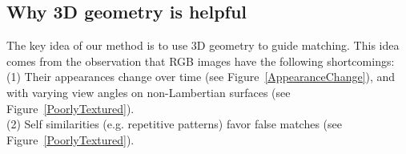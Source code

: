 
\subsection{Why 3D geometry is helpful}
The key idea of our method is to use 3D geometry to guide matching. This idea comes from the observation that RGB images have the following shortcomings:\\
(1) Their appearances change over time (see Figure~\ref{AppearanceChange}), and with varying view angles on non-Lambertian surfaces (see Figure~\ref{PoorlyTextured}).\\
(2) Self similarities (e.g. repetitive patterns) favor false matches (see Figure~\ref{PoorlyTextured}).\\

